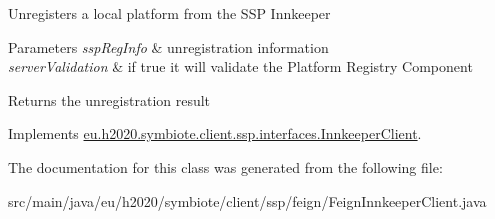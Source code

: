 Unregisters a local platform from the S\+SP Innkeeper


\begin{DoxyParams}{Parameters}
{\em ssp\+Reg\+Info} & unregistration information \\
\hline
{\em server\+Validation} & if true it will validate the Platform Registry Component \\
\hline
\end{DoxyParams}
\begin{DoxyReturn}{Returns}
the unregistration result 
\end{DoxyReturn}


Implements \hyperlink{interfaceeu_1_1h2020_1_1symbiote_1_1client_1_1ssp_1_1interfaces_1_1InnkeeperClient_a9f8da16b1de6aef89ae679dca5a9592c}{eu.\+h2020.\+symbiote.\+client.\+ssp.\+interfaces.\+Innkeeper\+Client}.



The documentation for this class was generated from the following file\+:\begin{DoxyCompactItemize}
\item 
src/main/java/eu/h2020/symbiote/client/ssp/feign/Feign\+Innkeeper\+Client.\+java\end{DoxyCompactItemize}
